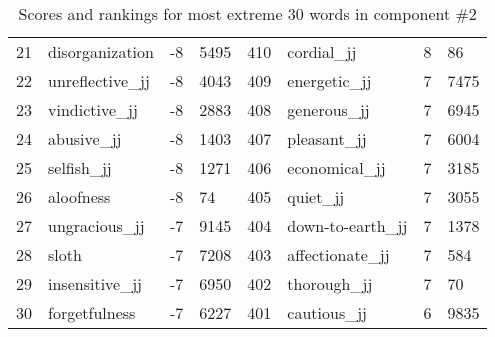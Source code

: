 \begin{table}[tbp]
\begin{tabular}{| rlr@{.}l | rlr@{.}l |}
    21 & disorganization & -8 & 5495    &    410 & cordial\_jj & 8 & 86 \\
    22 & unreflective\_jj & -8 & 4043    &    409 & energetic\_jj & 7 & 7475 \\
    23 & vindictive\_jj & -8 & 2883    &    408 & generous\_jj & 7 & 6945 \\
    24 & abusive\_jj & -8 & 1403    &    407 & pleasant\_jj & 7 & 6004 \\
    25 & selfish\_jj & -8 & 1271    &    406 & economical\_jj & 7 & 3185 \\
    26 & aloofness & -8 & 74    &    405 & quiet\_jj & 7 & 3055 \\
    27 & ungracious\_jj & -7 & 9145    &    404 & down-to-earth\_jj & 7 & 1378 \\
    28 & sloth & -7 & 7208    &    403 & affectionate\_jj & 7 & 584 \\
    29 & insensitive\_jj & -7 & 6950    &    402 & thorough\_jj & 7 & 70 \\
    30 & forgetfulness & -7 & 6227    &    401 & cautious\_jj & 6 & 9835 \\
    \hline
    \end{tabular}
    \caption{Scores and rankings for most extreme 30 words in component \#2} 
\end{table}
\clearpage
